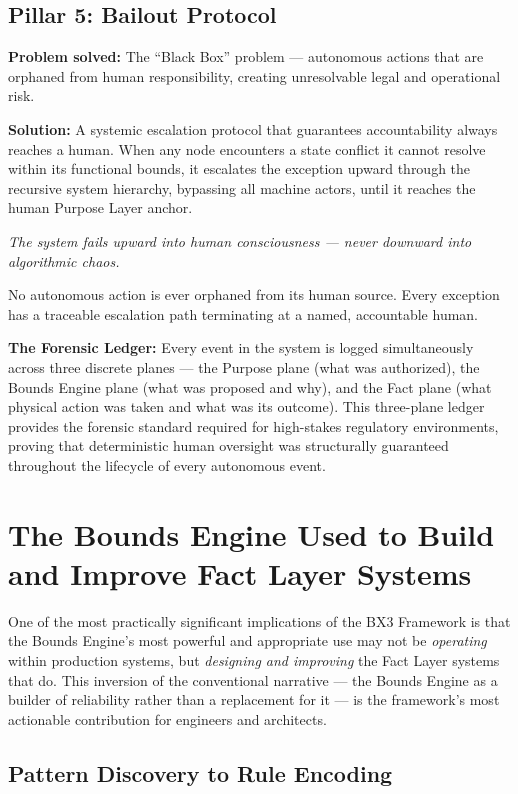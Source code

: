 \documentclass[12pt]{article}
\begin{document}
\subsection{Pillar 5: Bailout Protocol}

\textbf{Problem solved:} The ``Black Box'' problem --- autonomous actions that are orphaned from human responsibility, creating unresolvable legal and operational risk.

\textbf{Solution:} A systemic escalation protocol that guarantees accountability always reaches a human. When any node encounters a state conflict it cannot resolve within its functional bounds, it escalates the exception upward through the recursive system hierarchy, bypassing all machine actors, until it reaches the human Purpose Layer anchor.

\textit{The system fails upward into human consciousness --- never downward into algorithmic chaos.}

No autonomous action is ever orphaned from its human source. Every exception has a traceable escalation path terminating at a named, accountable human.

\textbf{The Forensic Ledger:} Every event in the system is logged simultaneously across three discrete planes --- the Purpose plane (what was authorized), the Bounds Engine plane (what was proposed and why), and the Fact plane (what physical action was taken and what was its outcome). This three-plane ledger provides the forensic standard required for high-stakes regulatory environments, proving that deterministic human oversight was structurally guaranteed throughout the lifecycle of every autonomous event.

\section{The Bounds Engine Used to Build and Improve Fact Layer Systems}
\label{sec:building}

One of the most practically significant implications of the BX3 Framework is that the Bounds Engine's most powerful and appropriate use may not be \textit{operating} within production systems, but \textit{designing and improving} the Fact Layer systems that do. This inversion of the conventional narrative --- the Bounds Engine as a builder of reliability rather than a replacement for it --- is the framework's most actionable contribution for engineers and architects.

\subsection{Pattern Discovery to Rule Encoding}
\end{document}
